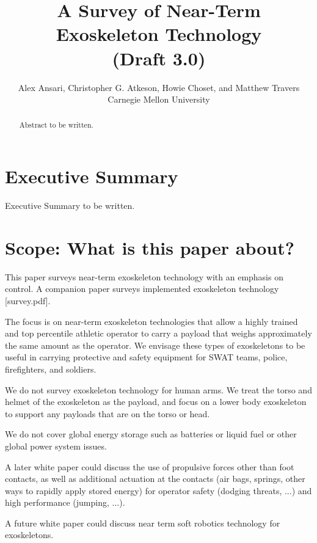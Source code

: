 \documentclass[letterpaper,12pt,fullpage]{article}
\begin{document}
\title{A Survey of Near-Term Exoskeleton Technology\\
(Draft 3.0)}

\author{Alex Ansari, Christopher G. Atkeson, Howie Choset, and Matthew Travers\\
Carnegie Mellon University}

\maketitle

\begin{abstract}
Abstract to be written.
\end{abstract}

\section{Executive Summary}

Executive Summary to be written.

\section{Scope: What is this paper about?}

This paper surveys near-term exoskeleton technology with an
emphasis on control.
A companion paper surveys implemented exoskeleton technology [survey.pdf].

The focus is on near-term exoskeleton technologies that allow a
highly trained and top percentile athletic 
operator to carry a payload that weighs approximately the same amount
as the operator. We envisage these types of exoskeletons to be useful
in carrying protective and safety equipment for SWAT teams, police,
firefighters, and soldiers. 

We do not survey exoskeleton technology for human arms. 
We treat the torso and helmet of the exoskeleton as the payload,
and focus on a lower body exoskeleton to support any payloads that
are on the torso or head.

We do not cover global energy storage such as batteries or liquid fuel
or other global power system issues.

A later white paper could discuss the use of propulsive forces other
than foot contacts, as well as additional actuation at the contacts (air
bags, springs, other ways to rapidly apply stored energy) for
operator safety (dodging threats, ...) and high performance (jumping, ...).

A future white paper could discuss near term soft robotics technology
for exoskeletons.
\end{document}
